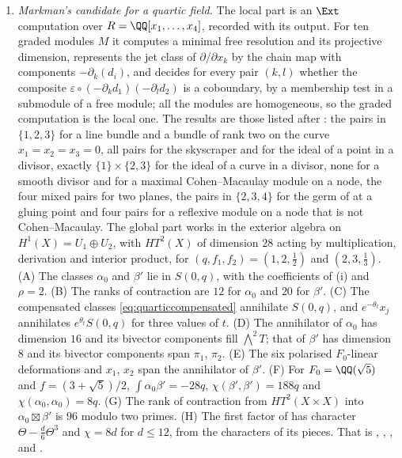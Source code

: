 \begin{enumerate}[label=\textup{(\Roman*)},leftmargin=*]
\item \emph{Markman's candidate for a quartic field.} The local part is an
  $\Ext$ computation over $R=\QQ[x_{1},\dots,x_{4}]$, recorded with its
  output. For ten graded modules $M$ it computes a minimal free resolution
  and its projective dimension, represents the jet class of
  $\partial/\partial x_{k}$ by the chain map with components
  $-\partial_{k}(d_{i})$, and decides for every pair $(k,l)$ whether the
  composite $\varepsilon\circ(-\partial_{k}d_{1})(-\partial_{l}d_{2})$ is a
  coboundary, by a membership test in a submodule of a free module; all the
  modules are homogeneous, so the graded computation is the local one. The
  results are those listed after : the pairs in
  $\{1,2,3\}$ for a line bundle and a bundle of rank two on the curve
  $x_{1}=x_{2}=x_{3}=0$, all pairs for the skyscraper and for the ideal of a
  point in a divisor, exactly $\{1\}\times\{2,3\}$ for the ideal of a curve
  in a divisor, none for a smooth divisor and for a maximal Cohen--Macaulay
  module on a node, the four mixed pairs for two planes, the pairs in
  $\{2,3,4\}$ for the germ of \cite[Example~11.2.7]{Mar25c} at a gluing point
  and four pairs for a reflexive module on a node that is not Cohen--Macaulay.
  The global part works in the exterior algebra on
  $H^{1}(X)=U_{1}\oplus U_{2}$, with $HT^{2}(X)$ of dimension $28$ acting by
  multiplication, derivation and interior product, for
  $(q,f_{1},f_{2})=(1,2,\tfrac12)$ and $(2,3,\tfrac13)$. (A) The classes
  $\alpha_{0}$ and $\beta'$ lie in $S(0,q)$, with the coefficients of
  (i) and $\rho=2$. (B) The ranks of
  contraction are $12$ for $\alpha_{0}$ and $20$ for $\beta'$. (C) The
  compensated classes \eqref{eq:quarticcompensated} annihilate $S(0,q)$, and
  $e^{-\theta_{t}}x_{j}$ annihilates $e^{\theta_{t}}S(0,q)$ for three values
  of $t$. (D) The annihilator of $\alpha_{0}$ has dimension $16$ and its
  bivector components fill $\bigwedge^{2}T$; that of $\beta'$ has dimension
  $8$ and its bivector components span $\pi_{1}$, $\pi_{2}$. (E) The six
  polarised $F_{0}$-linear deformations and $x_{1}$, $x_{2}$ span the
  annihilator of $\beta'$. (F) For $F_{0}=\QQ(\sqrt5)$ and $f=(3+\sqrt5)/2$,
  $\int\alpha_{0}\beta'=-28q$, $\chi(\beta',\beta')=188q$ and
  $\chi(\alpha_{0},\alpha_{0})=8q$. (G) The rank of contraction from
  $HT^{2}(X\times X)$ into $\alpha_{0}\boxtimes\beta'$ is $96$ modulo two
  primes. (H) The first factor of \cite[Example~8.2.4]{Mar25a} has character
  $\Theta-\frac d6\Theta^{3}$ and $\chi=8d$ for $d\le12$, from the characters
  of its pieces. That is , ,
  ,  and
  .


\end{enumerate}
